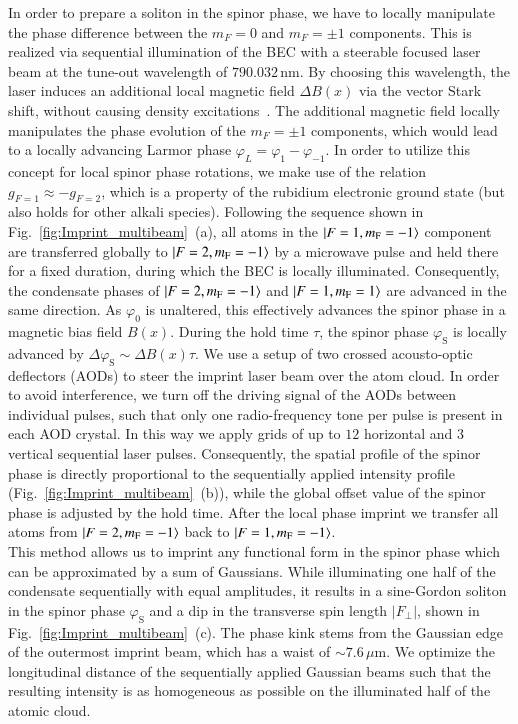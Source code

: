 \documentclass[aps,

               pra,
               twocolumn,
               amsmath,
               amssymb,
               superscriptaddress,
               reprint,
               10pt
              ]{revtex4-2}
\newcommand{\phis}{\varphi_\mathrm{S}}
\newcommand{\mf}{m_\mathrm{F}}
\newcommand{\Fperp}{F_{\perp}}
\begin{document}
\begin{appendix}
In order to prepare a soliton in the spinor phase, we have to locally manipulate the phase difference between the \(m_F = 0\) and $m_F = \pm 1$ components. This is realized via sequential illumination of the BEC with a steerable focused laser beam at the tune-out wavelength of $790.032 \,\mathrm{nm}$. By choosing this wavelength, the laser induces an additional local magnetic field $\Delta B(x)$ via the vector Stark shift, without causing density excitations~\cite{Pruefer2022}. The additional magnetic field locally manipulates the phase evolution of the $m_F = \pm1$ components, which would lead to a locally advancing Larmor phase $\varphi_L =  \varphi_1 - \varphi_{-1}$. In order to utilize this concept for local spinor phase rotations, we make use of the relation $g_{F=1} \approx - g_{F=2}$, which is a property of the rubidium electronic ground state (but also holds for other alkali species).
Following the sequence shown in Fig.~\ref{fig:Imprint_multibeam}~(a),
all atoms in the $\ket{F=1, \mf=-1}$ component are transferred globally to $\ket{F=2, \mf=-1}$ by a microwave pulse and held there for a fixed duration, during which the BEC is locally illuminated. Consequently, the condensate phases of $\ket{F=2, \mf=-1}$ and $\ket{F=1, \mf=1}$ are advanced in the same direction. As $\varphi_0$ is unaltered, this effectively advances the spinor phase in a magnetic bias field $B(x)$. During the hold time $\tau$, the spinor phase $\phis$ is locally advanced by $\Delta \phis \sim \Delta B(x) \tau$. We use a setup of two crossed acousto-optic deflectors (AODs) to steer the imprint laser beam over the atom cloud. In order to avoid interference, we turn off the driving signal of the AODs between individual pulses, such that only one radio-frequency tone per pulse is present in each AOD crystal. In this way we apply grids of up to $12$ horizontal and $3$ vertical sequential laser pulses. Consequently, the spatial profile of the spinor phase is directly proportional to the sequentially applied intensity profile (Fig.~\ref{fig:Imprint_multibeam}~(b)), while the global offset value of the spinor phase is adjusted by the hold time. After the local phase imprint we transfer all atoms from $\ket{F=2,\mf=-1}$ back to $\ket{F=1, \mf=-1}$.\\
This method allows us to imprint any functional form in the spinor phase which can be approximated by a sum of Gaussians. While illuminating one half of the condensate sequentially with equal amplitudes, it results in a sine-Gordon soliton in the spinor phase $\phis$ and a dip in the transverse spin length $|\Fperp|$, shown in Fig.~\ref{fig:Imprint_multibeam}~(c). The phase kink stems from the Gaussian edge of the outermost imprint beam, which has a waist of $\sim 7.6 \,\mu \mathrm{m}$. We optimize the longitudinal distance of the sequentially applied Gaussian beams such that the resulting intensity is as homogeneous as possible on the illuminated half of the atomic cloud.


\end{appendix}
\end{document}

